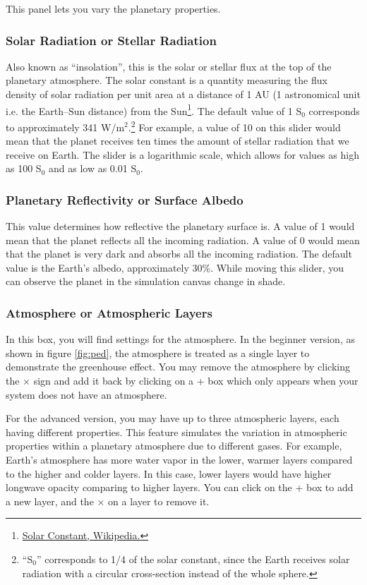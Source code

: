 \documentclass[a4paper,12pt]{article}
\begin{document}
This panel lets you vary the planetary properties.

\subsubsection*{Solar Radiation or Stellar Radiation}

Also known as ``insolation'', this is the solar or stellar flux at the top of the planetary atmosphere. The solar constant is a quantity measuring the flux density of solar radiation per unit area at a distance of 1 AU (1 astronomical unit i.e. the Earth--Sun distance) from the Sun\footnote{\href{https://en.wikipedia.org/wiki/Solar_constant}{Solar Constant, Wikipedia.}}. The default value of 1 S$_0$ corresponds to approximately 341 W/m$^2$.\footnote{``S$_0$'' corresponds to 1/4 of the solar constant, since the Earth receives solar radiation with a circular cross-section instead of the whole sphere.} For example, a value of 10 on this slider would mean that the planet receives ten times the amount of stellar radiation that we receive on Earth. The slider is a logarithmic scale, which allows for values as high as 100 S$_0$ and as low as 0.01 S$_0$. 


\subsubsection*{Planetary Reflectivity or Surface Albedo}

This value determines how reflective the planetary surface is. A value of 1 would mean that the planet reflects all the incoming radiation. A value of 0 would mean that the planet is very dark and absorbs all the incoming radiation. The default value is the Earth's albedo, approximately 30\%. While moving this slider, you can observe the planet in the simulation canvas change in shade.

\subsubsection*{Atmosphere or Atmospheric Layers}

In this box, you will find settings for the atmosphere. In the beginner version, as shown in figure \ref{fig:ped}, the atmosphere is treated as a single layer to demonstrate the greenhouse effect. You may remove the atmosphere by clicking the $\times$ sign and add it back by clicking on a + box which only appears when your system does not have an atmosphere.

For the advanced version, you may have up to three atmospheric layers, each having different properties. This feature simulates the variation in atmospheric properties within a planetary atmosphere due to different gases. For example, Earth's atmosphere has more water vapor in the lower, warmer layers compared to the higher and colder layers. In this case, lower layers would have higher longwave opacity comparing to higher layers. You can click on the + box to add a new layer, and the $\times$ on a layer to remove it. 
\end{document}
